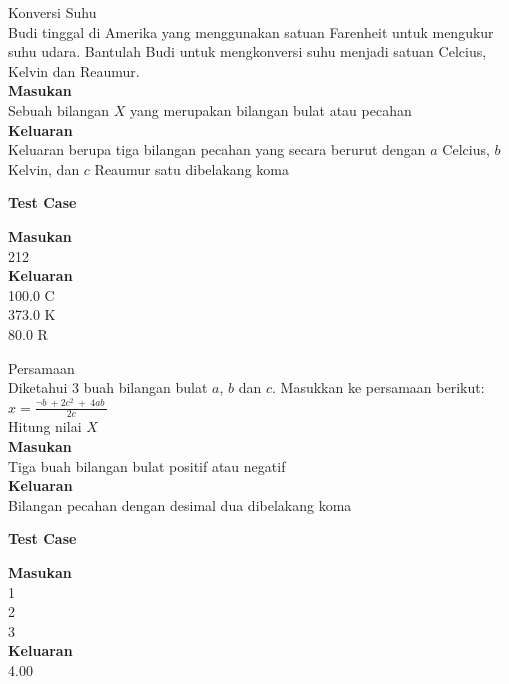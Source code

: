 \newpage
\begin{permasalahan}{Konversi Suhu}\\
\label{prob:KonversiSuhu}
Budi tinggal di Amerika yang menggunakan satuan  Farenheit untuk mengukur suhu udara. Bantulah Budi untuk mengkonversi suhu menjadi satuan Celcius, Kelvin dan Reaumur. \\ 
	\textbf{Masukan}\\
	Sebuah bilangan $X$ yang merupakan bilangan bulat atau pecahan\\
	\textbf{Keluaran}\\
Keluaran berupa tiga bilangan pecahan yang secara berurut dengan $a$ Celcius, $b$ Kelvin, dan $c$ Reaumur satu dibelakang koma
 	\begin{center}
	\textbf{Test Case}\\
	\end{center}
	\textbf{Masukan}\\
	212\\
	\textbf{Keluaran}\\
	100.0 C\\
	373.0 K\\
	80.0 R
\end{permasalahan}

\newpage
\begin{permasalahan}{Persamaan}\\
\label{prob:Persamaan}
Diketahui 3 buah bilangan bulat $a$, $b$ dan $c$. Masukkan ke persamaan berikut: \\
	
		 $x = \frac{\neg b\ +2c^{2}\ +\ 4ab\ }{2c}$ \\
	
Hitung nilai $X$ \\
	\textbf{Masukan}\\
	Tiga buah bilangan bulat positif atau negatif \\
	\textbf{Keluaran}\\
	Bilangan pecahan dengan desimal dua dibelakang koma \\
 	\begin{center}
	\textbf{Test Case}\\
	\end{center}
	\textbf{Masukan}\\
	1\\
	2\\
	3\\
	\textbf{Keluaran}\\
	4.00\\
\end{permasalahan}

